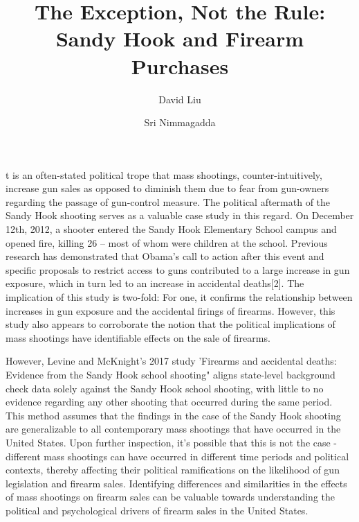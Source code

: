 \documentclass[9pt,twocolumn,twoside,lineno]{pnas-new}
\title{The Exception, Not the Rule: Sandy Hook and Firearm Purchases}
\author[a,1]{David Liu}
\author[b,1]{Sri Nimmagadda}
\affil[a]{Princeton University, Department of Computer Science}
\affil[b]{Princeton University, Woodrow Wilson School of Public and International Affairs}
\begin{document}
\maketitle
\thispagestyle{firststyle}

t is an often-stated political trope that mass shootings, counter-intuitively, increase gun sales as opposed to diminish them due to fear from gun-owners regarding the passage of gun-control measure\cite{pinsker_why_2017}. The political aftermath of the Sandy Hook shooting serves as a valuable case study in this regard. On December 12th, 2012, a shooter entered the Sandy Hook Elementary School campus and opened fire, killing 26 – most of whom were children at the school. Previous research has demonstrated that Obama’s call to action after this event and specific proposals to restrict access to guns contributed to a large increase in gun exposure, which in turn led to an increase in accidental deaths[2]. The implication of this study is two-fold: For one, it confirms the relationship between increases in gun exposure and the accidental firings of firearms. However, this study also appears to corroborate the notion that the political implications of mass shootings have identifiable effects on the sale of firearms.

However, Levine and McKnight's 2017 study 'Firearms and accidental deaths: Evidence from the Sandy Hook school shooting" aligns state-level background check data solely against the Sandy Hook school shooting, with little to no evidence regarding any other shooting that occurred during the same period. This method assumes that the findings in the case of the Sandy Hook shooting are generalizable to all contemporary mass shootings that have occurred in the United States. Upon further inspection, it's possible that this is not the case - different mass shootings can have occurred in different time periods and political contexts, thereby affecting their political ramifications on the likelihood of gun legislation and firearm sales. Identifying differences and similarities in the effects of mass shootings on firearm sales can be valuable towards understanding the political and psychological drivers of firearm sales in the United States.
\end{document}
